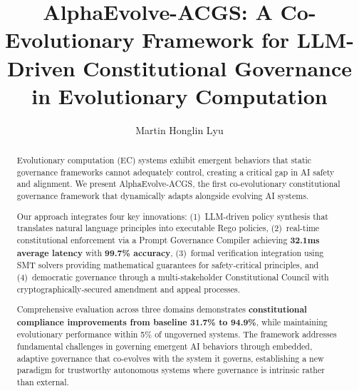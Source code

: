 \documentclass[sigconf,natbib]{acmart}
\begin{document}
\balance %

\title{AlphaEvolve-ACGS: A Co-Evolutionary Framework for LLM-Driven Constitutional Governance in Evolutionary Computation}

\author{Martin Honglin Lyu}

\authorsaddresses{} %

\renewcommand{\shortauthors}{Lyu}

\begin{abstract}
Evolutionary computation (EC) systems exhibit emergent behaviors that static governance frameworks cannot adequately control, creating a critical gap in AI safety and alignment. We present AlphaEvolve-ACGS, the first co-evolutionary constitutional governance framework that dynamically adapts alongside evolving AI systems.

Our approach integrates four key innovations: (1)~LLM-driven policy synthesis that translates natural language principles into executable Rego policies, (2)~real-time constitutional enforcement via a Prompt Governance Compiler achieving \textbf{32.1ms average latency} with \textbf{99.7\% accuracy}, (3)~formal verification integration using SMT solvers providing mathematical guarantees for safety-critical principles, and (4)~democratic governance through a multi-stakeholder Constitutional Council with cryptographically-secured amendment and appeal processes.

Comprehensive evaluation across three domains demonstrates \textbf{constitutional compliance improvements from baseline 31.7\% to 94.9\%}, while maintaining evolutionary performance within 5\% of ungoverned systems. The framework addresses fundamental challenges in governing emergent AI behaviors through embedded, adaptive governance that co-evolves with the system it governs, establishing a new paradigm for trustworthy autonomous systems where governance is intrinsic rather than external.
\end{abstract}
\end{document}
